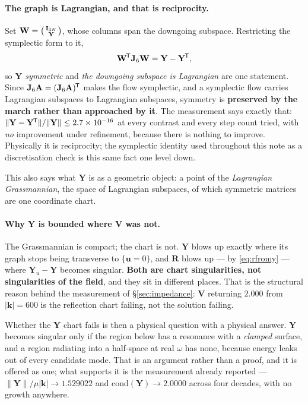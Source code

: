 \documentclass[11pt,a4paper]{article}
\newcommand{\bA}{\mathbf{A}}
\newcommand{\bV}{\mathbf{V}}
\newcommand{\bu}{\mathbf{u}}
\newcommand{\Jsix}{\mathbf{J}_{6}}
\newcommand{\tp}{^{\mkern-1.5mu\mathsf{T}}}
\newcommand{\bR}{\mathbf{R}}
\newcommand{\bY}{\mathbf{Y}}
\begin{document}
\paragraph{The graph is Lagrangian, and that is reciprocity.}  Set
$\mathbf{W}=\begin{psmallmatrix}\mathbf{I}_{3N}\\ \bY\end{psmallmatrix}$, whose
columns span the downgoing subspace.  Restricting the symplectic form to it,
\begin{equation}\label{eq:lagrangian}
  \mathbf{W}\tp\Jsix\mathbf{W} = \bY-\bY\tp,
\end{equation}
so \emph{$\bY$ symmetric} and \emph{the downgoing subspace is Lagrangian} are
one statement.  Since $\Jsix\bA=(\Jsix\bA)\tp$ makes the flow symplectic, and a
symplectic flow carries Lagrangian subspaces to Lagrangian subspaces, symmetry
is \textbf{preserved by the march rather than approached by it}.  The
measurement says exactly that: $\|\bY-\bY\tp\|/\|\bY\| \le 2.7\times10^{-16}$
at every contrast and every step count tried, with \emph{no} improvement under
refinement, because there is nothing to improve.  Physically it is reciprocity;
the symplectic identity used throughout this note as a discretisation check is
this same fact one level down.

This also says what $\bY$ is as a geometric object: a point of the
\emph{Lagrangian Grassmannian}, the space of Lagrangian subspaces, of which
symmetric matrices are one coordinate chart.

\paragraph{Why $\bY$ is bounded where $\bV$ was not.}  The Grassmannian is
compact; the chart is not.  $\bY$ blows up exactly where its graph stops being
transverse to $\{\bu=0\}$, and $\bR$ blows up --- by \eqref{eq:rfromy} --- where
$\bY_u-\bY$ becomes singular.  \textbf{Both are chart singularities, not
singularities of the field}, and they sit in different places.  That is the
structural reason behind the measurement of \S\ref{sec:impedance}: $\bV$
returning $2.000$ from $|\mathbf{k}|=600$ is the reflection chart failing, not
the solution failing.

Whether the $\bY$ chart fails is then a physical question with a physical
answer.  $\bY$ becomes singular only if the region below has a resonance with a
\emph{clamped} surface, and a region radiating into a half-space at real
$\omega$ has none, because energy leaks out of every candidate mode.  That is an
argument rather than a proof, and it is offered as one; what supports it is the
measurement already reported --- $\|\bY\|/\mu|\mathbf{k}|\to1.529022$ and
$\mathrm{cond}(\bY)\to2.0000$ across four decades, with no growth anywhere.
\end{document}
